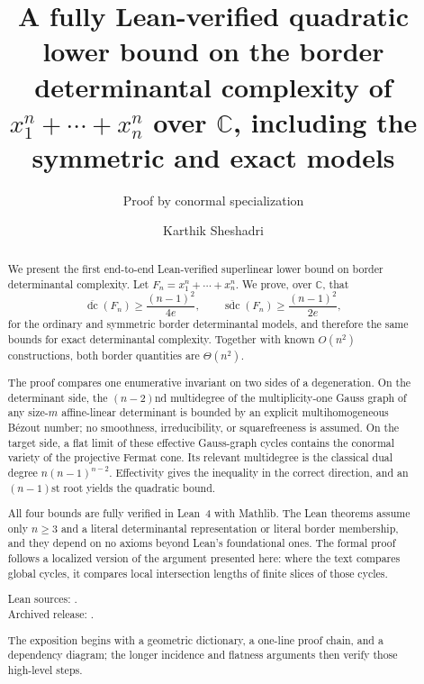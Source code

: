 \documentclass[acmsmall,screen,nonacm]{acmart}
\theoremstyle{definition}
\theoremstyle{remark}
\DeclareMathOperator{\dc}{dc}
\DeclareMathOperator{\sdc}{sdc}
\newcommand{\CC}{\mathbb{C}}
\newcommand{\dcb}{\overline{\dc}}
\newcommand{\sdcb}{\overline{\sdc}}
\begin{document}
\title[A fully Lean-verified quadratic border determinantal lower bound]{A fully Lean-verified quadratic lower bound on the border determinantal complexity of \texorpdfstring{$x_1^n+\cdots+x_n^n$}{x1\textasciicircum n + ... + xn\textasciicircum n} over \texorpdfstring{$\CC$}{C}, including the symmetric and exact models}
\subtitle{Proof by conormal specialization}

\author{Karthik Sheshadri}
\renewcommand{\shortauthors}{K. Sheshadri}

\begin{abstract}
We present the first end-to-end Lean-verified superlinear lower bound on border determinantal complexity.  Let $F_n=x_1^n+\cdots+x_n^n$.  We prove, over $\CC$, that
\[
  \dcb(F_n)\ge \frac{(n-1)^2}{4e},
  \qquad
  \sdcb(F_n)\ge \frac{(n-1)^2}{2e},
\]
for the ordinary and symmetric border determinantal models, and therefore the same bounds for exact determinantal complexity.  Together with known $O(n^2)$ constructions, both border quantities are $\Theta(n^2)$.

The proof compares one enumerative invariant on two sides of a degeneration.  On the determinant side, the $(n-2)$nd multidegree of the multiplicity-one Gauss graph of any size-$m$ affine-linear determinant is bounded by an explicit multihomogeneous B\'ezout number; no smoothness, irreducibility, or squarefreeness is assumed.  On the target side, a flat limit of these effective Gauss-graph cycles contains the conormal variety of the projective Fermat cone.  Its relevant multidegree is the classical dual degree $n(n-1)^{n-2}$.  Effectivity gives the inequality in the correct direction, and an $(n-1)$st root yields the quadratic bound.

All four bounds are fully verified in Lean~4 with Mathlib.  The Lean theorems assume only $n\ge3$ and a literal determinantal representation or literal border membership, and they depend on no axioms beyond Lean's foundational ones.  The formal proof follows a localized version of the argument presented here: where the text compares global cycles, it compares local intersection lengths of finite slices of those cycles.

Lean sources: \leanRepositoryURL.\\
Archived release: \leanArchiveDOI.

The exposition begins with a geometric dictionary, a one-line proof chain, and a dependency diagram; the longer incidence and flatness arguments then verify those high-level steps.
\end{abstract}
\end{document}
